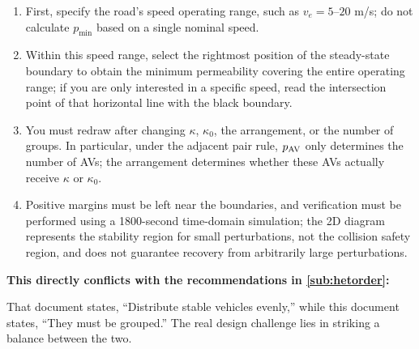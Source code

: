 \documentclass[11pt,a4paper,openany]{book}
\numberwithin{equation}{chapter}
\numberwithin{figure}{chapter}
\numberwithin{table}{chapter}
\begin{document}
\begin{tcolorbox}[notebox,title=\textbf{How to use this figure}]
\begin{enumerate}[leftmargin=1.5em,itemsep=3pt]
\item




First, specify the road’s speed operating range, such as $v_e=5$–$20$ m/s; do not calculate $p_{\min}$ based on a single nominal speed.







\item




Within this speed range, select the rightmost position of the steady-state boundary to obtain the minimum permeability covering the entire operating range; if you are only interested in a specific speed, read the intersection point of that horizontal line with the black boundary.


\item You must redraw after changing $\kappa$, $\kappa_0$, the arrangement, or the number of groups. In particular, under the adjacent pair rule, $p_{\rm AV}$ only determines the number of AVs; the arrangement determines whether these AVs actually receive $\kappa$ or $\kappa_0$.







\item




Positive margins must be left near the boundaries, and verification must be performed using a 1800-second time-domain simulation; the 2D diagram represents the stability region for small perturbations, not the collision safety region, and does not guarantee recovery from arbitrarily large perturbations.







\end{enumerate}
\end{tcolorbox}

\textbf{This directly conflicts with the recommendations in \ref{sub:hetorder}:}




That document states, “Distribute stable vehicles evenly,” while this document states, “They must be grouped.” The real design challenge lies in striking a balance between the two.
\end{document}
